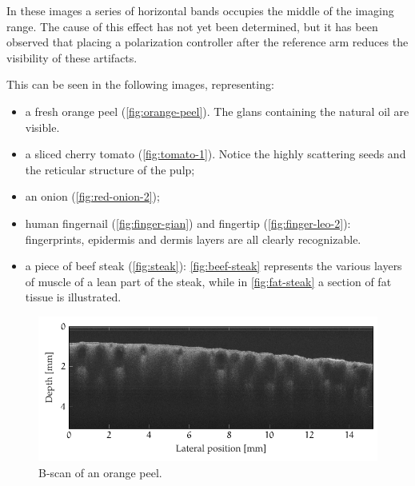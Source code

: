 


In these images a series of horizontal bands occupies the middle of the imaging range. The cause of this effect has not yet been determined, but it has been observed that placing a polarization controller after the reference arm reduces the visibility of these artifacts. 

This can be seen in the following images, representing:
\begin{itemize}
	\item a fresh orange peel (\autoref{fig:orange-peel}). The glans containing the natural oil are visible.
	
	\item a sliced cherry tomato (\autoref{fig:tomato-1}). Notice the highly scattering seeds and the reticular structure of the pulp;
	
	\item an onion (\autoref{fig:red-onion-2});
	
	\item human fingernail (\autoref{fig:finger-gian}) and fingertip (\autoref{fig:finger-leo-2}): fingerprints, epidermis and dermis layers are all clearly recognizable.
	
	\item a piece of beef steak (\autoref{fig:steak}): \autoref{fig:beef-steak} represents the various layers of muscle of a lean part of the steak, while in \autoref{fig:fat-steak} a section of fat tissue is illustrated.
\end{itemize}

\begin{figure}[hbt]
	\centering
	\includegraphics[width=0.9\linewidth]{gfx/ch4/axsun/no-bande/orange-peel}
	\caption{B-scan of an orange peel.}\label{fig:orange-peel}
\end{figure}

